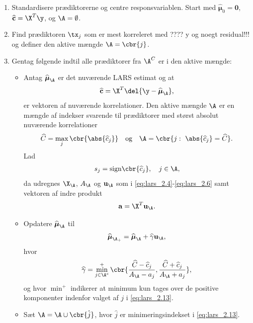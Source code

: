 \begin{alg} 
\begin{enumerate}
\item Standardisere prædiktorerne og centre responsvariablen. 
Start med \(\widehat{\boldsymbol{\mu}}_0 = \mathbf{0}\), \(\widehat{\mathbf{c}} = \X^T \y\), og \(\A = \emptyset\).
\item Find prædiktoren \(\tx_j\) som er mest korreleret med ???? y og noegt residual!!! og definer den aktive mængde \(\A = \cbr{j}\).
\item Gentag følgende indtil alle prædiktorer fra \(\A^C\) er i den aktive mængde:
\begin{itemize}
\item Antag \(\widehat{\boldsymbol{\mu}}_\A\) er det nuværende LARS estimat og at
\begin{align}
\widehat{\mathbf{c}} = \X^T \del{\y - \widehat{\boldsymbol{\mu}}_\A}, \label{eq:lars_2.8}
\end{align} 
er vektoren af nuværende korrelationer.
Den aktive mængde \(\A\) er en mængde af indekser svarende til prædiktorer med størst absolut nuværende korrelationer
\begin{align}
\widehat{C} = \max_j \cbr{\abs{\widehat{c}_j}} \quad \text{og} \quad \A= \cbr{j: \ \abs{ \widehat{c}_j} = \widehat{C}}. \label{eq:lars_2.9}
\end{align}
Lad 
\begin{align*}
s_j = \text{sign} \cbr{\widehat{c}_j}, \quad j \in \A,
\end{align*}
da udregnes \(\X_\A\), \(A_\A\) og \(\mathbf{u}_\A\) som i \eqref{eq:lars_2.4}-\eqref{eq:lars_2.6}  samt vektoren af indre produkt
\begin{align*}
\mathbf{a} = \X^T \mathbf{u}_\A.
\end{align*}
\item Opdatere \(\widehat{\boldsymbol{\mu}}_\A\) til
\begin{align}
\widehat{\boldsymbol{\mu}}_{\A_+} = \widehat{\boldsymbol{\mu}}_\A + \widehat{\gamma} \mathbf{u}_\A, \label{eq:lars_2.12}
\end{align}
hvor 
\begin{align}
\widehat{\gamma} = \min_{j \in \A^c}^+ \cbr{ \frac{\widehat{C}- \widehat{c}_j}{A_\A - a_j} , \frac{\widehat{C} + \widehat{c}_j}{A_\A + a_j}}, \label{eq:lars_2.13}
\end{align}
og hvor \(\min^+\) indikerer at minimum kun tages over de positive komponenter indenfor valget af \(j\) i \eqref{eq:lars_2.13}.
\item Sæt \(\A = \A \cup \cbr{\hat{j}}\), hvor \(\hat{j}\) er minimeringsindekset i \eqref{eq:lars_2.13}.
\end{itemize}
\end{enumerate}
\end{alg}
